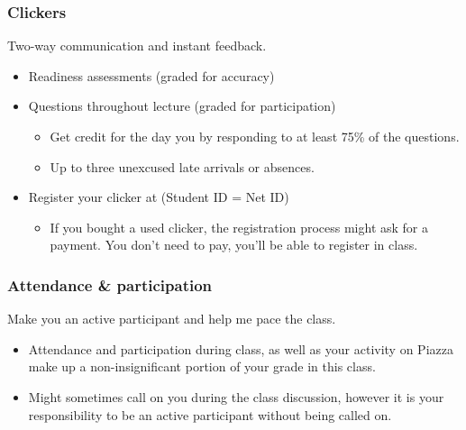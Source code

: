 \documentclass[slidestop,compress,mathserif,12pt,t,professionalfonts,xcolor=table]{beamer}
\begin{document}
\begin{frame}
\frametitle{Clickers}

 Two-way communication and instant feedback.

\begin{itemize}
\item Readiness assessments (graded for accuracy)

\item Questions throughout lecture (graded for participation)
\begin{itemize}
\item Get credit for the day you by responding to at least 75\% of the questions.
\item Up to three unexcused late arrivals or absences.
\end{itemize}

\item Register your clicker at  
(Student ID = Net ID)
\begin{itemize}
\item If you bought a used clicker, the registration process might ask for a payment. 
You don't need to pay, you'll be able to register in class.
\end{itemize}

\end{itemize}


\end{frame}


\begin{frame}
\frametitle{Attendance \& participation}

 Make you an active participant and help me pace the class.

\begin{itemize}

\item Attendance and participation during class, as well as your activity on Piazza 
make up a non-insignificant portion of your grade in this class.

\item Might sometimes call on you during the class discussion, however it is your 
responsibility to be an active participant without being called on.

\end{itemize}

\end{frame}
\end{document}
